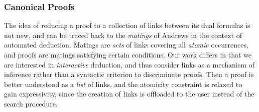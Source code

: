 \subsubsection*{Canonical Proofs}

The idea of reducing a proof to a collection of links between its dual formulas
is not new, and can be traced back to the \emph{matings} of Andrews
\cite{1674698} in the context of automated deduction. Matings are \emph{sets} of
links covering all \emph{atomic} occurrences, and proofs are matings satisfying
certain conditions. Our work differs in that we are interested in
\emph{interactive} deduction, and thus consider links as a mechanism of
inference rather than a syntactic criterion to discriminate proofs. Then a proof
is better understood as a \emph{list} of links, and the atomicity constraint is
relaxed to gain expressivity, since the creation of links is offloaded to the
user instead of the search procedure.

